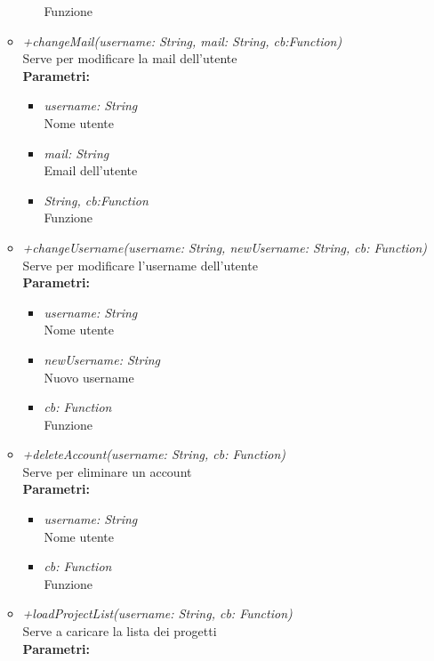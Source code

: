 \begin{itemize}
\begin{itemize}
\begin{itemize}
    			Funzione
    		\end{itemize}
    		\item \emph{+changeMail(username: String, mail: String, cb:Function)}\\
    		Serve per modificare la mail dell'utente\\
    		\textbf{Parametri:}
    		\begin{itemize}
    			\item \emph{username: String}\\
    			Nome utente
    			\item \emph{mail: String}\\
    			Email dell'utente
    			\item \emph{String, cb:Function}\\
    			Funzione
    		\end{itemize}
    		\item \emph{+changeUsername(username: String, newUsername: String, cb: Function)}\\
    		Serve per modificare l'username dell'utente\\
    		\textbf{Parametri:}
    		\begin{itemize}
    			\item \emph{username: String}\\
    			Nome utente
    			\item \emph{newUsername: String}\\
    			Nuovo username
    			\item \emph{cb: Function}\\
    			Funzione
    		\end{itemize}
    		\item \emph{+deleteAccount(username: String, cb: Function)}\\
    		Serve per eliminare un account\\
    		\textbf{Parametri:}
    		\begin{itemize}
    			\item \emph{username: String}\\
    			Nome utente
    			\item \emph{cb: Function}\\
    			Funzione
    		\end{itemize}
    		\item \emph{+loadProjectList(username: String, cb: Function)}\\
    		Serve a caricare la lista dei progetti\\
    		\textbf{Parametri:}

\end{itemize}
\end{itemize}
